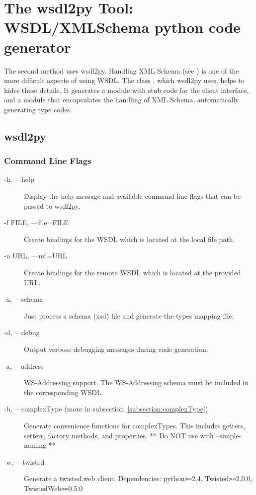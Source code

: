 \chapter{The wsdl2py Tool: WSDL/XMLSchema python code generator}

The second method uses wsdl2py.  Handling XML Schema
(see ) 
is one of the more difficult aspects
of using WSDL.  The class , which wsdl2py
uses, helps to hides these
details.  It generates a module with stub code for the client interface,
and a module that encapsulates the handling of XML Schema, automatically
generating type codes.

\section{wsdl2py}

\subsection{Command Line Flags}

\begin{description}
\item[-h, ---help] Display the help message and available command line
flags that can be passed to wsdl2py.
\item[-f FILE, ---file=FILE] Create bindings for the WSDL which is located at
the local file path.
\item[-u URL, ---url=URL] Create bindings for the remote WSDL which is located
at the provided URL.
\item[-x, ---schema] Just process a schema (xsd) file and generate the types
mapping file.
\item[-d, ---debug] Output verbose debugging messages during code generation.
\item[-a, ---address] WS-Addressing support.  The WS-Addressing schema must be
included in the corresponding WSDL.
\item[-b, ---complexType (more in subsection~\ref{subsection:complexType})]
Generate convenience functions for complexTypes.  This includes getters,
setters, factory methods, and properties.  ** Do NOT use with --simple-naming **
\item[-w, ---twisted] Generate a twisted.web client.  Dependencies: 
python\verb!>=!2.4, Twisted\verb!>=!2.0.0, TwistedWeb\verb!>=!0.5.0
\end{description}

